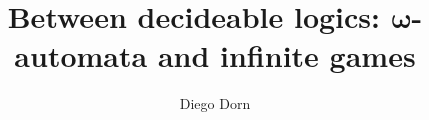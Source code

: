 \newcommand{\UseWhiteBackground}{1}  %


\title{Between decideable logics: $\mathbf{\omega}$-automata and infinite games}
\author{Diego Dorn}

\newcommand{\infiniteWords}{\infseq{(\IB^n)}}
\newcommand{\Sing}{\mathrm{Sing}}
\newcommand{\Succ}{\mathrm{Succ}}
\newcommand{\pathto}[1]{\overset{#1}\leadsto}
\newcommand{\inlinesafra}[1]{
    \pbox[c]{5cm}{
    \begin{forest}safra,
        [#1]
    \end{forest}
    }
}
\newcommand{\boite}[1]{\ifthenelse{\isempty{#1}}%
    {\Square}%
    {[#1]\,}%
}
\newcommand{\diam}[1]{\ifthenelse{\isempty{#1}}%
    {\Diamond}%
    {\langle#1\rangle\,}%
}
\newcommand{\Neigh}[3][]{\mathrm{Neigh}\ifthenelse{\isempty{#1}}{%
    \ifthenelse{\isempty{#2}}{%
        (#3)%
    }{%
        _{#2}(#3)%
    }
}{%
    ^{#1}_{#2}(#3)%
}}

\newcommand{\Meaning}[1]{\llbracket#1\rrbracket}
\newcommand{\Attacker}{\textsf{Attacker}\xspace}
\newcommand{\Defender}{\textsf{Defender}\xspace}
\newcommand{\Verifier}{\textsf{Verifier}\xspace}
\newcommand{\Falsifier}{\textsf{Falsifier}\xspace}
\newcommand{\AlternatingDepth}{\mathrm{adepth}}

\newcommand{\State}[1]{%
\begin{tikzpicture}[baseline=(O.base), minimum size=0.7cm, inner sep=0pt]
    \node[draw,circle] (O) {\(#1\)};
\end{tikzpicture}%
\xspace}

\newcommand{\spacedAutomata}[1]{\begin{center}
\begin{tikzpicture}[automata, node distance=90pt]
#1
\end{tikzpicture}
\end{center}}

\newcommand{\safranode}[2]{\nodepart{one}#1\nodepart{two}#2}

